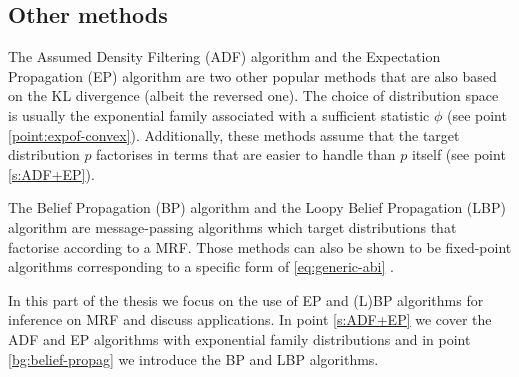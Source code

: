 \subsection{Other methods}

The Assumed Density Filtering (ADF) algorithm and the  Expectation Propagation (EP) algorithm are two other popular methods that are also based on the KL divergence (albeit the reversed one). 
The choice of distribution space is usually the exponential family associated with a sufficient statistic $\phi$ (see point \ref{point:expof-convex}). Additionally, these methods assume that the target distribution $p$ factorises in terms that are easier to handle than $p$ itself (see point \ref{s:ADF+EP}).

The Belief Propagation (BP) algorithm and the Loopy Belief Propagation (LBP) algorithm are message-passing algorithms which target distributions that factorise according to a MRF. Those methods can also be shown to be fixed-point algorithms corresponding to a specific form of \eqref{eq:generic-abi} \citep{yedidia01, yedidia02}.

In this part of the thesis we focus on the use of EP and (L)BP algorithms for inference on MRF and discuss applications. In point \ref{s:ADF+EP} we cover the ADF and EP algorithms with exponential family distributions and in point \ref{bg:belief-propag} we introduce the BP and LBP algorithms.




